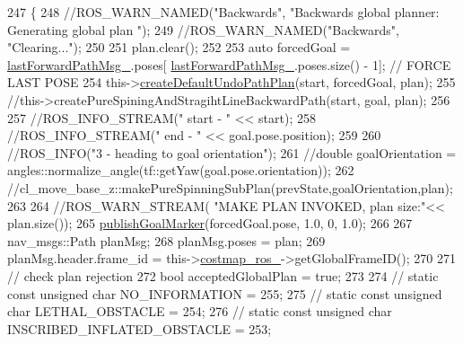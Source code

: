 \begin{DoxyCode}
247         \{
248             \textcolor{comment}{//ROS\_WARN\_NAMED("Backwards", "Backwards global planner: Generating global plan ");}
249             \textcolor{comment}{//ROS\_WARN\_NAMED("Backwards", "Clearing...");}
250 
251             plan.clear();
252 
253             \textcolor{keyword}{auto} forcedGoal = \hyperlink{classcl__move__base__z_1_1undo__path__global__planner_1_1UndoPathGlobalPlanner_a9a4a6e40f5b6cb5f77dedbc5b6170871}{lastForwardPathMsg\_}.poses[
      \hyperlink{classcl__move__base__z_1_1undo__path__global__planner_1_1UndoPathGlobalPlanner_a9a4a6e40f5b6cb5f77dedbc5b6170871}{lastForwardPathMsg\_}.poses.size() - 1]; \textcolor{comment}{// FORCE LAST POSE}
254             this->\hyperlink{classcl__move__base__z_1_1undo__path__global__planner_1_1UndoPathGlobalPlanner_a659c16f439d33ac7026a54bb65c26ca8}{createDefaultUndoPathPlan}(start, forcedGoal, plan);
255             \textcolor{comment}{//this->createPureSpiningAndStragihtLineBackwardPath(start, goal, plan);}
256 
257             \textcolor{comment}{//ROS\_INFO\_STREAM(" start - " << start);}
258             \textcolor{comment}{//ROS\_INFO\_STREAM(" end - " << goal.pose.position);}
259 
260             \textcolor{comment}{//ROS\_INFO("3 - heading to goal orientation");}
261             \textcolor{comment}{//double goalOrientation = angles::normalize\_angle(tf::getYaw(goal.pose.orientation));}
262             \textcolor{comment}{//cl\_move\_base\_z::makePureSpinningSubPlan(prevState,goalOrientation,plan);}
263 
264             \textcolor{comment}{//ROS\_WARN\_STREAM( "MAKE PLAN INVOKED, plan size:"<< plan.size());}
265             \hyperlink{classcl__move__base__z_1_1undo__path__global__planner_1_1UndoPathGlobalPlanner_a37a85e1cd57173902d8302cb8cb9b933}{publishGoalMarker}(forcedGoal.pose, 1.0, 0, 1.0);
266 
267             nav\_msgs::Path planMsg;
268             planMsg.poses = plan;
269             planMsg.header.frame\_id = this->\hyperlink{classcl__move__base__z_1_1undo__path__global__planner_1_1UndoPathGlobalPlanner_ab63eeb465e3ae989a6edcc4d059cf8f0}{costmap\_ros\_}->getGlobalFrameID();
270 
271             \textcolor{comment}{// check plan rejection}
272             \textcolor{keywordtype}{bool} acceptedGlobalPlan = \textcolor{keyword}{true};
273 
274             \textcolor{comment}{// static const unsigned char NO\_INFORMATION = 255;}
275             \textcolor{comment}{// static const unsigned char LETHAL\_OBSTACLE = 254;}
276             \textcolor{comment}{// static const unsigned char INSCRIBED\_INFLATED\_OBSTACLE = 253;}

\end{DoxyCode}
